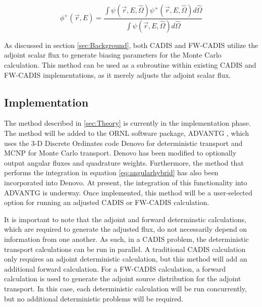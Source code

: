 \documentclass{mc2015}
\begin{document}
\begin{equation} 
\label{eq:angularhybrid}
\phi^{+}(\vec{r},E) = \frac{\int \psi(\vec {r} ,E,\hat{\Omega})\psi^+(\vec {r} ,E,\hat{\Omega})d\hat\Omega }{\int\psi(\vec {r} ,E,\hat{\Omega})d\hat\Omega}
\end{equation}

As discussed in section \ref{sec:Background}, both CADIS and FW-CADIS utilize the adjoint scalar flux to generate biasing parameters for the Monte Carlo calculation. 
This method can be used as a subroutine within existing CADIS and FW-CADIS implementations, as it merely adjusts the adjoint scalar flux.  

\subsection{Implementation}
\label{sec:Implement}

The method described in \ref{sec:Theory} is currently in the implementation phase. The method will be added to the ORNL software package, ADVANTG \cite{mosher_new_2010}, which uses the 3-D Discrete Ordinates code Denovo \cite{evans_denovo:_2010} for deterministic transport and MCNP \cite{brown_mcnp_2002} for Monte Carlo transport. Denovo has been modified to optionally output angular fluxes and quadrature weights. Furthermore, the method that performs the integration in equation \ref{eq:angularhybrid} has also been incorporated into Denovo. At present, the integration of this functionality into ADVANTG is underway. Once implemented, this method will be a user-selected option for running an adjusted CADIS or FW-CADIS calculation. 

It is important to note that the adjoint and forward determinstic calculations, which are required to generate the adjusted flux, do not necessarily depend on information from one another. As such, in a CADIS problem, the deterministic transport calculations can be run in parallel. A traditional CADIS calculation only requires an adjoint deterministic calculation, but this method will add an additional forward calculation. For a FW-CADIS calculation, a forward calculation is used to generate the adjoint source distribution for the adjoint transport. In this case, each deterministic calculation will be run concurrently, but no additional deterministic problems will be required. 
\end{document}
